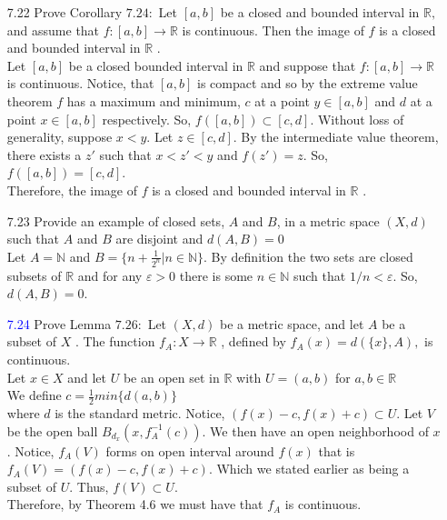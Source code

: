 \documentclass[12pt]{article}
\newcommand{\R}{\mathbb{R}}
\newcommand{\ak}[1]{\textcolor{blue}{#1}}
\begin{document}
	\pagestyle{fancy}  
	\lfoot{} \cfoot{} \rfoot{}
	
	\begin{enumerate}
		\item[7.22] Prove Corollary $7.24 :$ Let $[ a , b ]$ be a closed and bounded interval in $\R ,$ and
		assume that $f : [ a , b ] \rightarrow \mathbb { R }$ is continuous. Then the image of $f$ is a closed and
		bounded interval in $\mathbb { R }$ .\\
		Let $[a,b] $ be a closed bounded interval in $ \R $ and suppose that $ f:[a,b]\rightarrow \R $ is continuous. Notice, that $ [a,b] $ is compact and so by the extreme value theorem $ f $ has a maximum and minimum, $ c $ at a point $ y\in[a,b] $ and $ d $ at a point $ x\in[a,b] $ respectively. So, $ f([a,b])\subset [c,d] $. Without loss of generality, suppose $ x<y $. Let $ z\in[c,d] $. By the intermediate value theorem, there exists a $ z' $ such that $ x<z'<y $ and $ f(z')=z $. So, $ f([a,b])=[c,d] $. \\
		Therefore,  the image of $f$ is a closed and
		bounded interval in $\mathbb { R }$ .
		\item[7.23] Provide an example of closed sets, $ A $ and $ B $, in a metric space $ (X,d) $ such that $ A $ and $ B $ are disjoint and $ d(A,B)=0 $\\
		Let $ A = \mathbb{ N } $ and $ B=\{n+\frac{1}{2^n}|n\in\mathbb{ N }\} $. By definition the two sets are closed subsets of $ \R $ and for any $ \varepsilon > 0 $ there is some $ n\in \mathbb{ N } $ such that $ 1/n < \varepsilon $. So, $ d(A,B)= 0 $.
		\item[\ak{7.24}] Prove Lemma $7.26 :$ Let $( X , d )$ be a metric space, and let $A$ be a subset of $X$ .
		The function $f _ { A } : X \rightarrow \mathbb { R }$ , defined by $f _ { A } ( x ) = d ( \{ x \} , A ) ,$ is continuous.\\
		Let $ x\in X$ and let $ U $ be an open set in $ \R $ with $ U=(a,b) $ for $ a,b\in\R $\\
		We define $ c = \frac{1}{2}min\{d(a,b)\} $\\ where $ d $ is the standard metric. Notice, $ (f(x)-c,f(x)+c)\subset U $. Let $ V $ be the open ball $ B_{d_x}(x,f_A^{-1}(c)) $. We then have an open neighborhood of $ x $. Notice, $ f_A(V) $ forms on open interval around $ f(x) $ that is $ f_A(V)=(f(x)-c,f(x)+c)$. Which we stated earlier as being a subset of $ U $. Thus, $ f(V) \subset U$. \\
		Therefore, by Theorem 4.6 we must have that $ f_A $ is continuous.
		

\end{enumerate}
\end{document}
